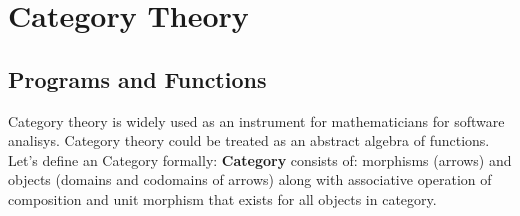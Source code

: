 \documentclass[11pt,oneside]{article}
\begin{document}
\newpage
\section{Category Theory}
\vspace{0.3cm}

   \subsection{Programs and Functions}
   Category theory is widely used as an instrument for mathematicians for software analisys.
   Category theory could be treated as an abstract algebra of functions. Let's define an Category
   formally: {\bf Category} consists of: morphisms (arrows) and objects (domains and codomains of arrows)
   along with associative operation of composition and unit morphism that exists for all objects in category.


\end{document}
